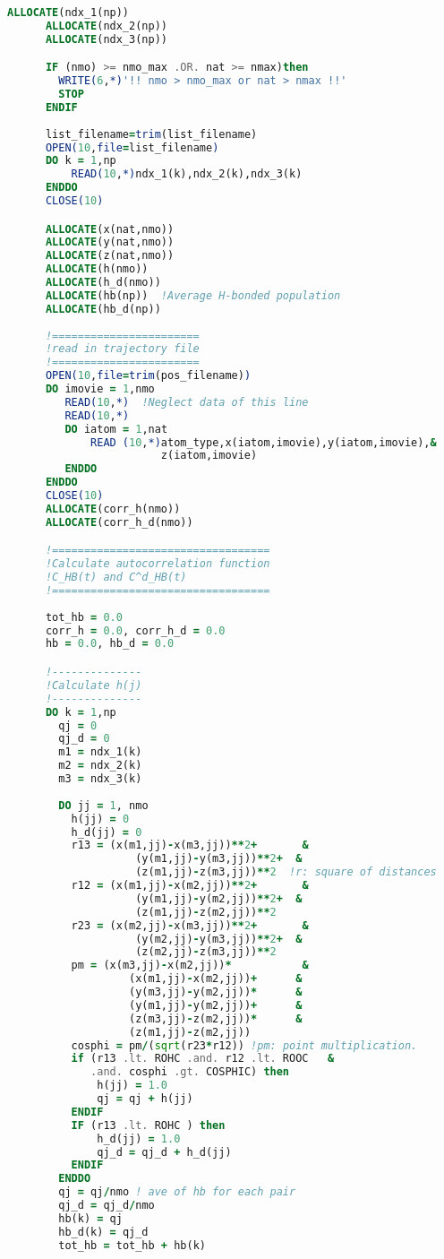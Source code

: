 \begin{lstlisting}[language=fortran]
      ALLOCATE(ndx_1(np))          
      ALLOCATE(ndx_2(np))          
      ALLOCATE(ndx_3(np))          

      IF (nmo) >= nmo_max .OR. nat >= nmax)then
        WRITE(6,*)'!! nmo > nmo_max or nat > nmax !!'
        STOP
      ENDIF
      
      list_filename=trim(list_filename)
      OPEN(10,file=list_filename)     
      DO k = 1,np
          READ(10,*)ndx_1(k),ndx_2(k),ndx_3(k)
      ENDDO
      CLOSE(10)

      ALLOCATE(x(nat,nmo))
      ALLOCATE(y(nat,nmo))
      ALLOCATE(z(nat,nmo))
      ALLOCATE(h(nmo))
      ALLOCATE(h_d(nmo))
      ALLOCATE(hb(np))  !Average H-bonded population 
      ALLOCATE(hb_d(np))
      
      !=======================
      !read in trajectory file 
      !=======================
      OPEN(10,file=trim(pos_filename))     
      DO imovie = 1,nmo
         READ(10,*)  !Neglect data of this line
         READ(10,*)                 
         DO iatom = 1,nat
             READ (10,*)atom_type,x(iatom,imovie),y(iatom,imovie),&
                        z(iatom,imovie)
         ENDDO
      ENDDO
      CLOSE(10)
      ALLOCATE(corr_h(nmo))
      ALLOCATE(corr_h_d(nmo))

      !==================================
      !Calculate autocorrelation function
      !C_HB(t) and C^d_HB(t)  
      !==================================
      
      tot_hb = 0.0
      corr_h = 0.0, corr_h_d = 0.0
      hb = 0.0, hb_d = 0.0

      !--------------
      !Calculate h(j)
      !--------------
      DO k = 1,np
        qj = 0
        qj_d = 0
        m1 = ndx_1(k)
        m2 = ndx_2(k)
        m3 = ndx_3(k)
        
        DO jj = 1, nmo
          h(jj) = 0
          h_d(jj) = 0 
          r13 = (x(m1,jj)-x(m3,jj))**2+       &
                    (y(m1,jj)-y(m3,jj))**2+  &
                    (z(m1,jj)-z(m3,jj))**2  !r: square of distances
          r12 = (x(m1,jj)-x(m2,jj))**2+       &
                    (y(m1,jj)-y(m2,jj))**2+  &
                    (z(m1,jj)-z(m2,jj))**2
          r23 = (x(m2,jj)-x(m3,jj))**2+       &
                    (y(m2,jj)-y(m3,jj))**2+  &
                    (z(m2,jj)-z(m3,jj))**2
          pm = (x(m3,jj)-x(m2,jj))*           &
                   (x(m1,jj)-x(m2,jj))+      & 
                   (y(m3,jj)-y(m2,jj))*      & 
                   (y(m1,jj)-y(m2,jj))+      & 
                   (z(m3,jj)-z(m2,jj))*      &
                   (z(m1,jj)-z(m2,jj)) 
          cosphi = pm/(sqrt(r23*r12)) !pm: point multiplication.
          if (r13 .lt. ROHC .and. r12 .lt. ROOC   & 
             .and. cosphi .gt. COSPHIC) then    
              h(jj) = 1.0 
              qj = qj + h(jj)                          
          ENDIF
          IF (r13 .lt. ROHC ) then                           
              h_d(jj) = 1.0
              qj_d = qj_d + h_d(jj)                          
          ENDIF
        ENDDO   
        qj = qj/nmo ! ave of hb for each pair 
        qj_d = qj_d/nmo
        hb(k) = qj
        hb_d(k) = qj_d
        tot_hb = tot_hb + hb(k)


\end{lstlisting}
